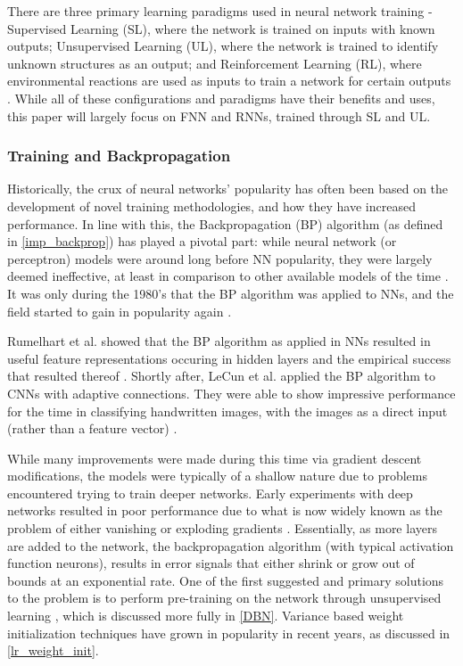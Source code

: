 \documentclass[a4paper,11pt,oneside]{article}
\theoremstyle{plain}
\theoremstyle{definition}
\begin{document}
	There are three primary learning paradigms used in neural network training - Supervised Learning (SL), 
	where the network is trained on inputs with known outputs; Unsupervised Learning (UL), where the network is 
	trained to identify unknown structures as an output; and Reinforcement Learning (RL), where environmental
	reactions are used as inputs to train a network for certain outputs \cite{Schmidhuber}. While all of these configurations and paradigms 
	have their benefits and uses, this paper will largely focus on FNN and RNNs, trained through SL and UL.
	\hfill \break 
	
	\subsubsection{Training and Backpropagation}\label{lr_trainingbackprop}
	
	Historically, the crux of neural networks’ popularity has often been based on the development of novel training 
	methodologies, and how they have increased performance. In line with this, the Backpropagation (BP) algorithm (as defined in \ref{imp_backprop})
	has played a pivotal part: while neural network (or perceptron) models were around long before NN popularity, 
	they were largely deemed ineffective, at least in comparison to other available models of the time 
	\cite{Minksy}. It was only during the 1980’s that the BP algorithm was applied to NNs, and 
	the field started to gain in popularity again \cite{LeCun2, Werbos2}. 
	\hfill \break 
	
	Rumelhart et al. showed that the BP algorithm as applied in NNs resulted in useful feature representations 
	occuring in hidden layers and the empirical success that resulted thereof \cite{Rumelhart}.  
	Shortly after, LeCun et al. applied the BP algorithm to CNNs with adaptive connections. They were able to show 
	impressive performance for the time in classifying handwritten images, with the images as a direct input (rather than a feature vector) \cite{LeCun3}.
	\hfill \break 
	
	While many improvements were made during this time via gradient descent modifications, the 
	models were typically of a shallow nature due to problems encountered trying to train deeper networks. 
	Early experiments with deep networks resulted in poor performance due to what is now widely known as the problem 
	of either vanishing or exploding gradients \cite{Pascanu}. Essentially, as more layers are added to the network, the backpropagation 
	algorithm (with typical activation function neurons), results in error signals that either shrink or grow out of bounds at an 
	exponential rate. One of the first suggested and primary solutions to the problem is to perform pre-training on the 
	network through unsupervised learning  \cite{Schmidhuber}, which is discussed more fully in \ref{DBN}. Variance based 
	weight initialization techniques have grown in popularity in recent years, as discussed in \ref{lr_weight_init}.
	\hfill \break 
	
\end{document}

